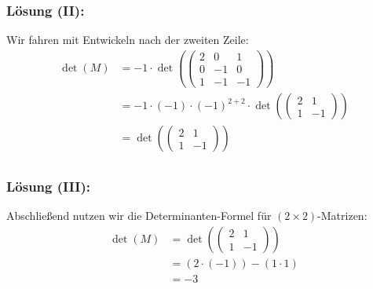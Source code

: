%
%
\begin{frame}\frametitle{Lösung (II):}
%	
Wir fahren mit Entwickeln nach der zweiten Zeile:\pause
\begin{align*}
\det(M)&=-1\cdot\det(\begin{pmatrix}
		 2	&  0& 1	\\
		 0	&  -1	& 0\\
		1	&  -1	& -1	
	\end{pmatrix})\\
&=-1\cdot(-1)\cdot(-1)^{2+2}\cdot\det(\begin{pmatrix}
		 2	&   1	\\
		1	& -1	
	\end{pmatrix})\\
&=\det(\begin{pmatrix}
		 2	&   1	\\
		1	& -1	
	\end{pmatrix})\\
\end{align*}
\end{frame}
%
%
\begin{frame}\frametitle{Lösung (III):}
%	
Abschließend nutzen wir die Determinanten-Formel für $(2 \times 2)$-Matrizen:\pause
\begin{align*}
\det(M)&=\det(\begin{pmatrix}
		 2	&   1	\\
		1	& -1	
	\end{pmatrix})\\
&=(2\cdot(-1)) - (1\cdot 1)\\
&=-3
\end{align*}
\end{frame}

